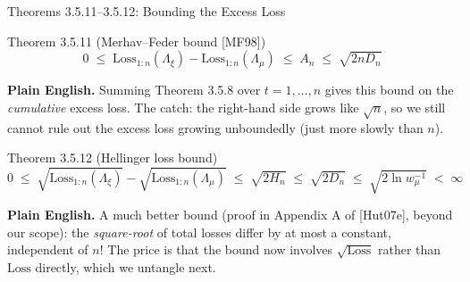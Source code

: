 \documentclass[aspectratio=169,10pt]{beamer}
\newcommand{\Loss}{\mathrm{Loss}}
\begin{document}
\begin{frame}{Theorems 3.5.11--3.5.12: Bounding the Excess Loss}
  \begin{block}{Theorem 3.5.11 (Merhav--Feder bound [MF98])}
    \[
      0 \; \le \; \Loss_{1:n}(\Lambda_\xi)-\Loss_{1:n}(\Lambda_\mu) \; \le \; A_n \; \le \; \sqrt{2nD_n}
    \]
  \end{block}
  \textbf{Plain English.} Summing Theorem 3.5.8 over $t=1,\dots,n$ gives this
  bound on the \emph{cumulative} excess loss. The catch: the right-hand side
  grows like $\sqrt{n}$, so we still cannot rule out the excess loss growing
  unboundedly (just more slowly than $n$).

  \begin{block}{Theorem 3.5.12 (Hellinger loss bound)}
    \[
      0 \; \le \; \sqrt{\Loss_{1:n}(\Lambda_\xi)} - \sqrt{\Loss_{1:n}(\Lambda_\mu)}
      \; \le \; \sqrt{2H_n} \; \le \; \sqrt{2D_n} \; \le \; \sqrt{2\ln w_\mu^{-1}} \; < \; \infty
    \]
  \end{block}
  \textbf{Plain English.} A much better bound (proof in Appendix A of
  [Hut07e], beyond our scope): the \emph{square-root} of total losses differ
  by at most a constant, independent of $n$! The price is that the bound
  now involves $\sqrt{\Loss}$ rather than $\Loss$ directly, which we untangle
  next.
\end{frame}
\end{document}
